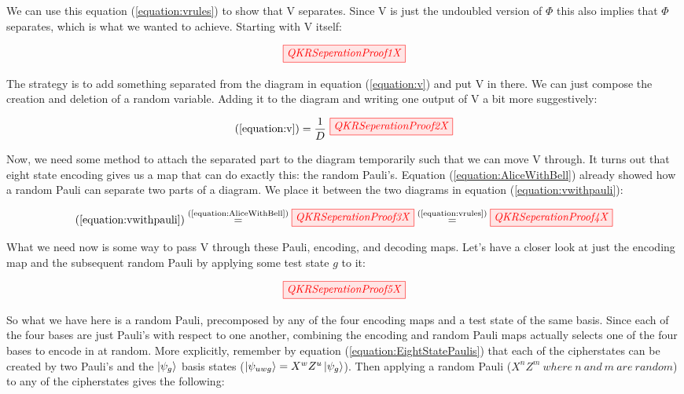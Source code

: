 \documentclass[]{article}
\newcommand{\equaltext}[1]{\ensuremath{\stackrel{\text{#1}}{=}}}
\begin{document}
We can use this equation (\ref{equation:vrules}) to show that V separates. Since V is just the undoubled version of $\Phi$ this also implies that $\Phi$ separates, which is what we wanted to achieve. Starting with V itself:

\begin{equation}
	\label{equation:v}
	\tikzfig{QKRSeperationProof1X}
\end{equation}

The strategy is to add something separated from the diagram in equation (\ref{equation:v}) and put V in there. We can just compose the creation and deletion of a random variable. Adding it to the diagram and writing one output of V a bit more suggestively:

\begin{equation}
	\label{equation:vwithpauli}
	(\ref{equation:v}) = \frac{1}{D}~
	\tikzfig{QKRSeperationProof2X}
\end{equation}

Now, we need some method to attach the separated part to the diagram temporarily such that we can move V through. It turns out that eight state encoding gives us a map that can do exactly this: the random Pauli's. Equation (\ref{equation:AliceWithBell}) already showed how a random Pauli can separate two parts of a diagram. We place it between the two diagrams in equation (\ref{equation:vwithpauli}):

\begin{equation}
\label{equation:movevthrough}
(\ref{equation:vwithpauli}) \equaltext{(\ref{equation:AliceWithBell})} \tikzfig{QKRSeperationProof3X} \equaltext{(\ref{equation:vrules})} \tikzfig{QKRSeperationProof4X}
\end{equation}

What we need now is some way to pass V through these Pauli, encoding, and decoding maps. Let's have a closer look at just the encoding map and the subsequent random Pauli by applying some test state $g$ to it:

\begin{equation}
	\label{equation:RedSpiderRandomPauli}
	\tikzfig{QKRSeperationProof5X}
\end{equation}

So what we have here is a random Pauli, precomposed by any of the four encoding maps and a test state of the same basis. Since each of the four bases are just Pauli's with respect to one another, combining the encoding and random Pauli maps actually selects one of the four bases to encode in at random. More explicitly, remember by equation (\ref{equation:EightStatePaulis}) that each of the cipherstates can be created by two Pauli's and the $\ket{\psi_g}$ basis states ($\ket{\psi_{uwg}} = X^w Z^u\ket{\psi_{g}}$). Then applying a random Pauli ($X^n Z^m~where~n~and~m~are~random$) to any of the cipherstates gives the following:
\end{document}
